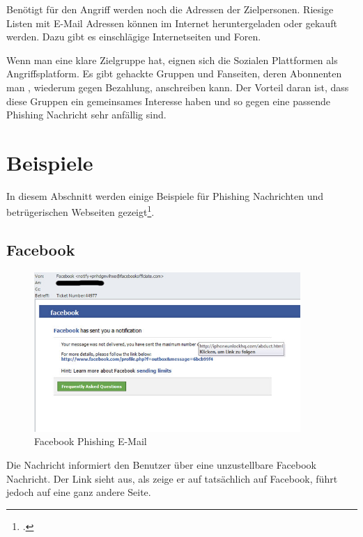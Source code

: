 Benötigt für den Angriff werden noch die Adressen der Zielpersonen. Riesige Listen mit E-Mail Adressen können im Internet heruntergeladen oder gekauft werden. Dazu gibt es einschlägige Internetseiten und Foren. 

Wenn man eine klare Zielgruppe hat, eignen sich die Sozialen Plattformen als Angriffsplatform. Es gibt gehackte Gruppen und Fanseiten, deren Abonnenten man , wiederum gegen Bezahlung, anschreiben kann. Der Vorteil daran ist, dass diese Gruppen ein gemeinsames Interesse haben und so gegen eine passende Phishing Nachricht sehr anfällig sind.

\section{Beispiele}
In diesem Abschnitt werden einige Beispiele für Phishing Nachrichten und betrügerischen Webseiten gezeigt\footcite{Was_sind_Phishing_emails_2015-05-22}.

\subsection{Facebook}
\begin{figure}[H]
  \centering
  \includegraphics[width=0.9\textwidth]{images/phishing-beispiel-facebook.jpg}
  \caption{Facebook Phishing E-Mail}
  \label{fig:phishing:beispiele:facebook}
\end{figure}

Die Nachricht informiert den Benutzer über eine unzustellbare Facebook Nachricht. Der Link sieht aus, als zeige er auf tatsächlich auf Facebook, führt jedoch auf eine ganz andere Seite. 

